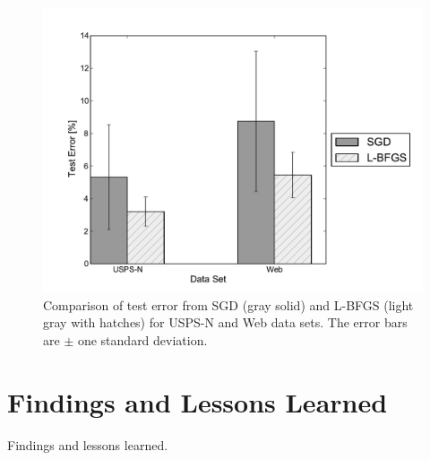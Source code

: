 \documentclass[10pt]{article}
\begin{document}
\begin{figure}[h]
\begin{center}
    \includegraphics[width=1.0\textwidth]{test_error.pdf}
    \caption{Comparison of test error from SGD (gray solid) and L-BFGS (light gray with hatches) for USPS-N and Web data sets. The error bars are $\pm$ one standard deviation.}
\end{center}
\end{figure}


\section{Findings and Lessons Learned}
\label{sec:conclusion}

Findings and lessons learned.





\end{document}
